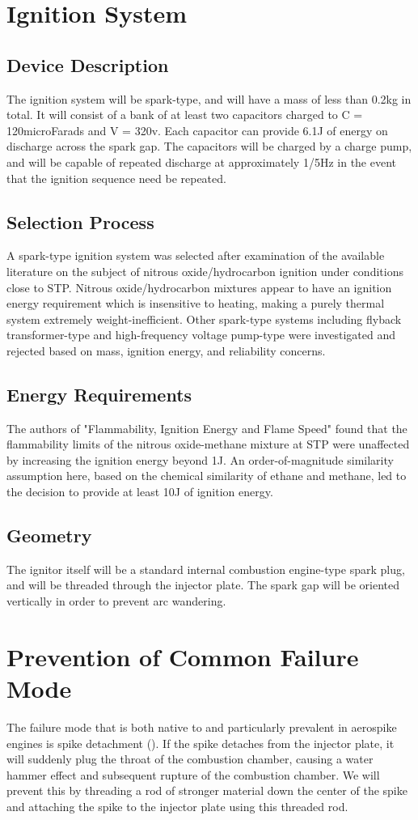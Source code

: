 \documentclass{article}
\begin{document}
\section*{Ignition System}
\subsection*{Device Description}
The ignition system will be spark-type, and will have a mass of less than 0.2kg in total. It will consist of a bank of at least two capacitors charged to C = 120microFarads and V = 320v. Each capacitor can provide 6.1J of energy on discharge across the spark gap. The capacitors will be charged by a charge pump, and will be capable of repeated discharge at approximately 1/5Hz in the event that the ignition sequence need be repeated.
\subsection*{Selection Process}
A spark-type ignition system was selected after examination of the available literature on the subject of nitrous oxide/hydrocarbon ignition under conditions close to STP. Nitrous oxide/hydrocarbon mixtures appear to have an ignition energy requirement which is insensitive to heating, making a purely thermal system extremely weight-inefficient. Other spark-type systems including flyback transformer-type and high-frequency voltage pump-type were investigated and rejected based on mass, ignition energy, and reliability concerns.
\subsection*{Energy Requirements}
The authors of "Flammability, Ignition Energy and Flame Speed" found that the flammability limits of the nitrous oxide-methane mixture at STP were unaffected by increasing the ignition energy beyond 1J. An order-of-magnitude similarity assumption here, based on the chemical similarity of ethane and methane, led to the decision to provide at least 10J of ignition energy.
\subsection*{Geometry}
The ignitor itself will be a standard internal combustion engine-type spark plug, and will be threaded through the injector plate. The spark gap will be oriented vertically in order to prevent arc wandering.

\section*{Prevention of Common Failure Mode}
The failure mode that is both native to and particularly prevalent in aerospike engines is spike detachment (\cite{Mueller}). If the spike detaches from the injector plate, it will suddenly plug the throat of the combustion chamber, causing a water hammer effect and subsequent rupture of the combustion chamber. We will prevent this by threading a rod of stronger material down the center of the spike and attaching the spike to the injector plate using this threaded rod.
\end{document}
